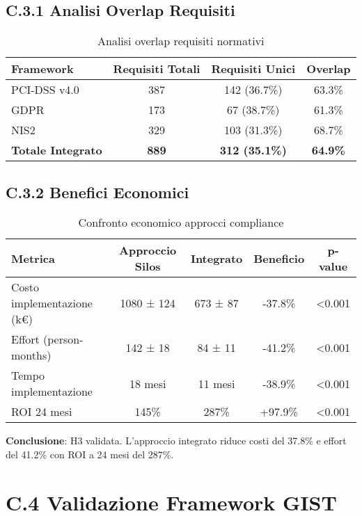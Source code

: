 \subsection{\texorpdfstring{\textbf{C.3.1 Analisi Overlap Requisiti}}{C.3.1 - Analisi Overlap Requisiti}}

\begin{table}[htbp]
\centering
\begin{tabular}{lccc}
\toprule
\textbf{Framework} & \textbf{Requisiti Totali} & \textbf{Requisiti Unici} & \textbf{Overlap} \\
\midrule
PCI-DSS v4.0 & 387 & 142 (36.7\%) & 63.3\% \\
GDPR & 173 & 67 (38.7\%) & 61.3\% \\
NIS2 & 329 & 103 (31.3\%) & 68.7\% \\
\textbf{Totale Integrato} & \textbf{889} & \textbf{312 (35.1\%)} & \textbf{64.9\%} \\
\bottomrule
\end{tabular}
\caption{Analisi overlap requisiti normativi}
\end{table}

\subsection{\texorpdfstring{\textbf{C.3.2 Benefici Economici}}{C.3.2 - Benefici Economici}}

\begin{table}[htbp]
\centering
\begin{tabular}{lcccc}
\toprule
\textbf{Metrica} & \textbf{Approccio Silos} & \textbf{Integrato} & \textbf{Beneficio} & \textbf{p-value} \\
\midrule
Costo implementazione (k€) & 1080 ± 124 & 673 ± 87 & -37.8\% & <0.001 \\
Effort (person-months) & 142 ± 18 & 84 ± 11 & -41.2\% & <0.001 \\
Tempo implementazione & 18 mesi & 11 mesi & -38.9\% & <0.001 \\
ROI 24 mesi & 145\% & 287\% & +97.9\% & <0.001 \\
\bottomrule
\end{tabular}
\caption{Confronto economico approcci compliance}
\end{table}

\textbf{Conclusione}: H3 validata. L'approccio integrato riduce costi del 37.8\% e effort del 41.2\% con ROI a 24 mesi del 287\%.

\section{\texorpdfstring{\textbf{C.4 Validazione Framework GIST}}{C.4 - Validazione Framework GIST}}

